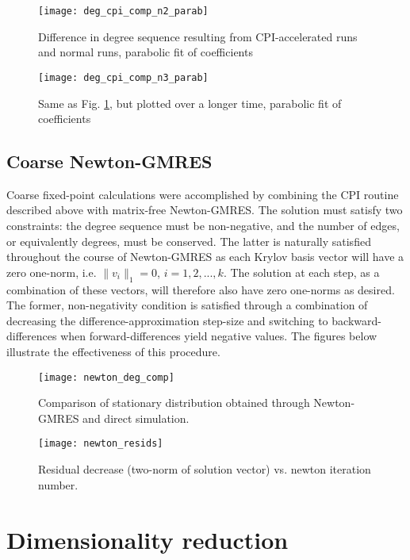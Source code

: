\documentclass[11pt]{article}
\begin{document}
\begin{figure}[!h]
  \texttt{[image: deg\_cpi\_comp\_n2\_parab]}
  \caption{Difference in degree sequence resulting from CPI-accelerated runs and normal runs, parabolic fit of coefficients}
  \label{fig:degcomp_n2_parab}
\end{figure}

\begin{figure}[!h]
  \texttt{[image: deg\_cpi\_comp\_n3\_parab]}
  \caption{Same as Fig. \ref{fig:degcomp_n2_parab}, but plotted over a longer time, parabolic fit of coefficients}
\end{figure}

\subsection{Coarse Newton-GMRES}

Coarse fixed-point calculations were accomplished by combining the CPI routine described above with matrix-free Newton-GMRES. The solution must satisfy two constraints: the degree sequence must be non-negative, and the number of edges, or equivalently degrees, must be conserved. The latter is naturally satisfied throughout the course of Newton-GMRES as each Krylov basis vector will have a zero one-norm, i.e. $\| v_i \|_1 = 0$, $i = 1,2,...,k$. The solution at each step, as a combination of these vectors, will therefore also have zero one-norms as desired. The former, non-negativity condition is satisfied through a combination of decreasing the difference-approximation step-size and switching to backward-differences when forward-differences yield negative values. The figures below illustrate the effectiveness of this procedure.

\begin{figure}[!h]
  \texttt{[image: newton\_deg\_comp]}
  \caption{Comparison of stationary distribution obtained through Newton-GMRES and direct simulation.}
\end{figure}

\begin{figure}[!h]
  \texttt{[image: newton\_resids]}
  \caption{Residual decrease (two-norm of solution vector) vs. newton iteration number.} 
\end{figure}

\clearpage

\section{Dimensionality reduction}
\end{document}
